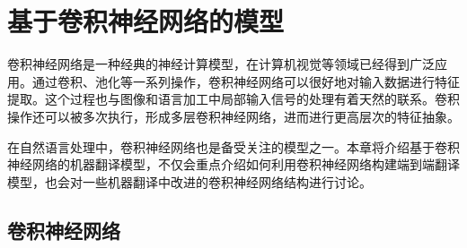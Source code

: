 
%


\renewcommand\figurename{图}%
\renewcommand\tablename{表}%
\newlength{\bcc}


\chapter{基于卷积神经网络的模型}

\parinterval 卷积神经网络是一种经典的神经计算模型，在计算机视觉等领域已经得到广泛应用。通过卷积、池化等一系列操作，卷积神经网络可以很好地对输入数据进行特征提取。这个过程也与图像和语言加工中局部输入信号的处理有着天然的联系。卷积操作还可以被多次执行，形成多层卷积神经网络，进而进行更高层次的特征抽象。

\parinterval 在自然语言处理中，卷积神经网络也是备受关注的模型之一。本章将介绍基于卷积神经网络的机器翻译模型，不仅会重点介绍如何利用卷积神经网络构建端到端翻译模型，也会对一些机器翻译中改进的卷积神经网络结构进行讨论。

\vspace{-1em}
\section{卷积神经网络}

